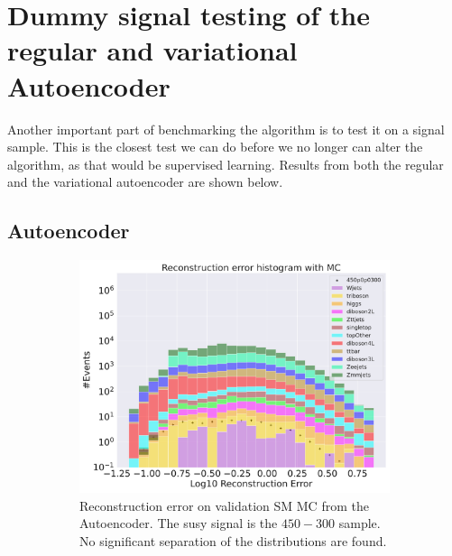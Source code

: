 \section{Dummy signal testing of the regular and variational Autoencoder}

Another important part of benchmarking the algorithm is to test it on a signal sample. This is the closest test we can do before
we no longer can alter the algorithm, as that would be supervised learning. Results from both the regular and the variational autoencoder 
are shown below. 

\subsection*{Autoencoder}

\begin{figure}[h!]
    \centering
    \begin{subfigure}{.8\textwidth}
        \includegraphics[width=\textwidth]{Figures/AE_testing/b_data_recon_big_rm3_feats_sig_450p0p0300.pdf}
        \caption{Reconstruction error on validation SM MC from the Autoencoder. The susy signal is the $450-300$ sample. 
        No significant separation of the distributions are found. }
        \label{fig:ae_susy_450_300_recon}
    \end{subfigure}
    \hfill
    \begin{subfigure}{.8\textwidth}

\end{subfigure}
\end{figure}
